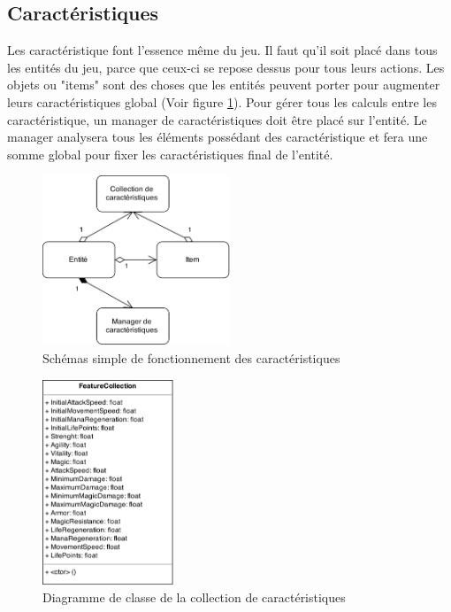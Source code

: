 \documentclass[11pt, a4paper, oneside]{report}
\begin{document}
\subsection{Caractéristiques}
\label{subsec:caracteristiques}
Les caractéristique font l'essence même du jeu. Il faut qu'il soit placé dans tous les entités du jeu, parce que ceux-ci se repose dessus pour tous leurs actions. Les objets ou "items" sont des choses que les entités peuvent porter pour augmenter leurs caractéristiques global (Voir figure \ref{fig:FeatureGlobalWork}).
Pour gérer tous les calculs entre les caractéristique, un manager de caractéristiques doit être placé sur l'entité. Le manager analysera tous les éléments possédant des caractéristique et fera une somme global pour fixer les caractéristiques final de l'entité.
\begin{figure}[H]
	\begin{center}
	\includegraphics[width=0.5\textwidth]{FeatureGlobalWork}
	\caption{Schémas simple de fonctionnement des caractéristiques}
	\label{fig:FeatureGlobalWork}
	\end{center}
\end{figure}
\begin{figure}[H]
	\begin{center}
	\includegraphics[width=0.35\textwidth]{FeatureCollection}
	\caption{Diagramme de classe de la collection de caractéristiques}
	\label{fig:FeatureCollection}
	\end{center}
\end{figure}
\end{document}
